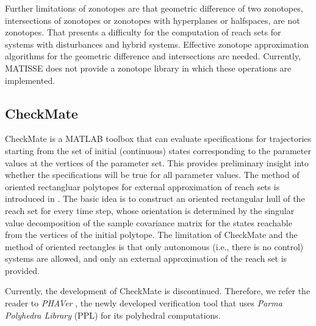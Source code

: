 Further limitations of zonotopes are that geometric difference of two
zonotopes, intersections of zonotopes or zonotopes with hyperplanes or
halfspaces, are not zonotopes.
That presents a difficulty for the computation of reach sets for systems
with disturbances and hybrid systems.
Effective zonotope approximation algorithms for the geometric difference
and intersections are needed.
Currently, MATISSE does not provide a zonotope library in which these
operations are implemented.











\subsection{CheckMate}\label{subsec_checkmate}
CheckMate \cite{checkmate} is a MATLAB toolbox that
can evaluate specifications for trajectories starting from the
set of initial (continuous) states corresponding to the parameter values at
the vertices of the parameter set.
This provides preliminary insight into whether the specifications
will be true for all parameter values.
The method of oriented rectangluar polytopes for external approximation
of reach sets is introduced in \cite{krogh03}.
The basic idea is to construct an oriented rectangular hull of the reach set
for every time step, whose orientation is determined by the singular value
decomposition of the sample covariance matrix for the states reachable
from the vertices of the initial polytope.
The limitation of CheckMate
and the method of oriented rectangles is that only autonomous
(i.e., there is no control) systems are allowed, and only an external approximation
of the reach set is provided.

Currently, the development of CheckMate is discontinued.
Therefore, we refer the reader to \emph{PHAVer} \cite{phaver},
the newly developed verification tool that uses \emph{Parma Polyhedra
Library} (PPL) \cite{ppl} for its polyhedral computations.


















